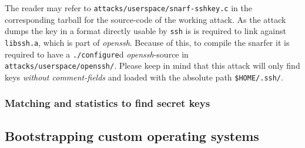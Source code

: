 The reader may refer to \texttt{attacks/userspace/snarf-sshkey.c} in the
corresponding tarball for the source-code of the working attack. As the attack
dumps the key in a format directly usable by \texttt{ssh} is is required to link
against \texttt{libssh.a}, which is part of \emph{openssh}. Because of this, to
compile the snarfer it is required to have a \texttt{./configure}d
\emph{openssh}-source in \texttt{attacks/userspace/openssh/}. Please keep in
mind that this attack will only find keys \emph{without comment-fields} and
loaded with the absolute path \texttt{\$HOME/.ssh/}.



\subsubsection{Matching and statistics to find secret keys}



\subsection{Bootstrapping custom operating systems}



